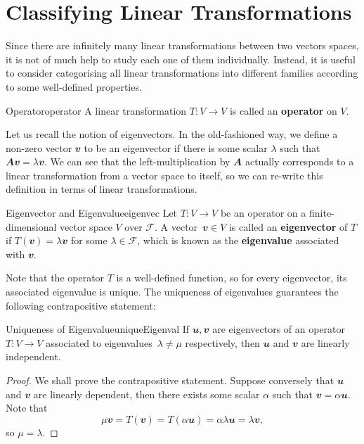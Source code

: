 \documentclass[math, code]{amznotes}
\theoremstyle{remark}
\begin{document}
\section{Classifying Linear Transformations}
Since there are infinitely many linear transformations between two vectors spaces, it is not of much help to study each one of them individually. Instead, it is useful to consider categorising all linear transformations into different families according to some well-defined properties.
\begin{dfnbox}{Operator}{operator}
    A linear transformation $T \colon V \to V$ is called an {\color{red} \textbf{operator}} on $V$.
\end{dfnbox}
Let us recall the notion of eigenvectors. In the old-fashioned way, we define a non-zero vector $\mathbfit{v}$ to be an eigenvector if there is some scalar $\lambda$ such that $\mathbfit{Av} = \lambda\mathbfit{v}$. We can see that the left-multiplication by $\mathbfit{A}$ actually corresponds to a linear transformation from a vector space to itself, so we can re-write this definition in terms of linear transformations.
\begin{dfnbox}{Eigenvector and Eigenvalue}{eigenvec}
    Let $T \colon V \to V$ be an operator on a finite-dimensional vector space $V$ over $\mathcal{F}$. A vector~$\mathbfit{v} \in V$ is called an {\color{red} \textbf{eigenvector}} of $T$ if $T(\mathbfit{v}) = \lambda\mathbfit{v}$ for some $\lambda \in \mathcal{F}$, which is known as the {\color{red} \textbf{eigenvalue}} associated with $\mathbfit{v}$.
\end{dfnbox}
Note that the operator $T$ is a well-defined function, so for every eigenvector, its associated eigenvalue is unique. The uniqueness of eigenvalues guarantees the following contrapositive statement:
\begin{probox}{Uniqueness of Eigenvalue}{uniqueEigenval}
    If $\mathbfit{u}, \mathbfit{v}$ are eigenvectors of an operator $T \colon V \to V$ associated to eigenvalues~$\lambda \neq \mu$ respectively, then $\mathbfit{u}$ and $\mathbfit{v}$ are linearly independent.
    \tcblower
    \begin{proof}
        We shall prove the contrapositive statement. Suppose conversely that $\mathbfit{u}$ and $\mathbfit{v}$ are linearly dependent, then there exists some scalar $\alpha$ such that $\mathbfit{v} = \alpha\mathbfit{u}$. Note that 
        \begin{equation*}
            \mu\mathbfit{v} = T(\mathbfit{v}) = T(\alpha\mathbfit{u}) = \alpha\lambda\mathbfit{u} = \lambda\mathbfit{v},
        \end{equation*}
        so $\mu = \lambda$.
    \end{proof}
\end{probox}
\end{document}
